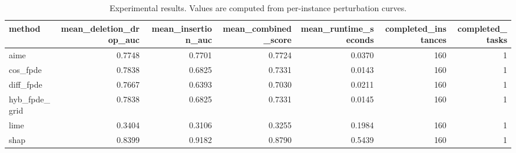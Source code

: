 \begin{table}[t]
\caption{Experimental results. Values are computed from per-instance perturbation curves.}
\label{tab:main_results_computed}
\centering
\begin{tabular}{lrrrrrr}
\toprule
method & mean\_deletion\_drop\_auc & mean\_insertion\_auc & mean\_combined\_score & mean\_runtime\_seconds & completed\_instances & completed\_tasks \\
\midrule
aime & 0.7748 & 0.7701 & 0.7724 & 0.0370 & 160 & 1 \\
cos\_fpde & 0.7838 & 0.6825 & 0.7331 & 0.0143 & 160 & 1 \\
diff\_fpde & 0.7667 & 0.6393 & 0.7030 & 0.0211 & 160 & 1 \\
hyb\_fpde\_grid & 0.7838 & 0.6825 & 0.7331 & 0.0145 & 160 & 1 \\
lime & 0.3404 & 0.3106 & 0.3255 & 0.1984 & 160 & 1 \\
shap & 0.8399 & 0.9182 & 0.8790 & 0.5439 & 160 & 1 \\
\bottomrule
\end{tabular}

\end{table}
